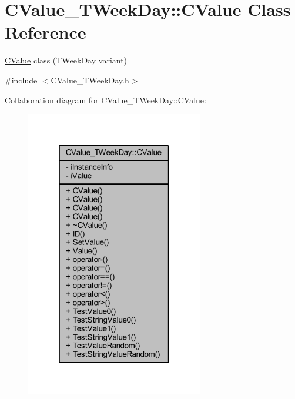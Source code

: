 \hypertarget{class_c_value___t_week_day_1_1_c_value}{}\section{C\+Value\+\_\+\+T\+Week\+Day\+:\+:C\+Value Class Reference}
\label{class_c_value___t_week_day_1_1_c_value}


\hyperlink{class_c_value___t_week_day_1_1_c_value}{C\+Value} class ({\ttfamily T\+Week\+Day} variant)  




{\ttfamily \#include $<$C\+Value\+\_\+\+T\+Week\+Day.\+h$>$}



Collaboration diagram for C\+Value\+\_\+\+T\+Week\+Day\+:\+:C\+Value\+:\nopagebreak
\begin{figure}[H]
\begin{center}
\leavevmode
\includegraphics[width=219pt]{class_c_value___t_week_day_1_1_c_value__coll__graph}
\end{center}
\end{figure}
